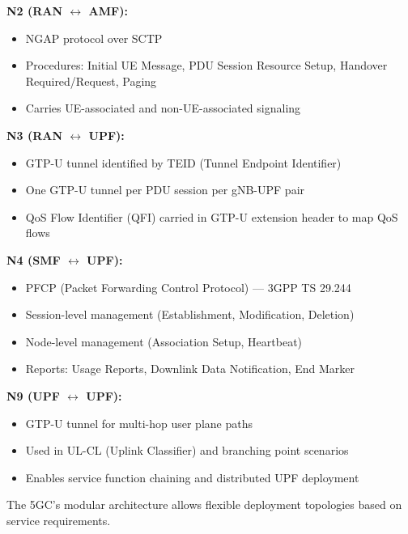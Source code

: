 \textbf{N2 (RAN \ensuremath{\leftrightarrow} AMF):}

\begin{itemize}
\tightlist
\item
  NGAP protocol over SCTP
\item
  Procedures: Initial UE Message, PDU Session Resource Setup, Handover Required/\allowbreak{}Request, Paging
\item
  Carries UE-associated and non-UE-associated signaling
\end{itemize}

\textbf{N3 (RAN \ensuremath{\leftrightarrow} UPF):}

\begin{itemize}
\tightlist
\item
  GTP-U tunnel identified by TEID (Tunnel Endpoint Identifier)
\item
  One GTP-U tunnel per PDU session per gNB-UPF pair
\item
  QoS Flow Identifier (QFI) carried in GTP-U extension header to map QoS flows
\end{itemize}

\textbf{N4 (SMF \ensuremath{\leftrightarrow} UPF):}

\begin{itemize}
\tightlist
\item
  PFCP (Packet Forwarding Control Protocol) — 3GPP TS 29.244
\item
  Session-level management (Establishment, Modification, Deletion)
\item
  Node-level management (Association Setup, Heartbeat)
\item
  Reports: Usage Reports, Downlink Data Notification, End Marker
\end{itemize}

\textbf{N9 (UPF \ensuremath{\leftrightarrow} UPF):}

\begin{itemize}
\tightlist
\item
  GTP-U tunnel for multi-hop user plane paths
\item
  Used in UL-CL (Uplink Classifier) and branching point scenarios
\item
  Enables service function chaining and distributed UPF deployment
\end{itemize}


The 5GC’s modular architecture allows flexible deployment topologies based on service requirements.


